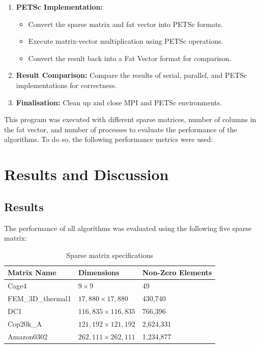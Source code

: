 \documentclass[12pt,oneside]{book} %
\begin{document}
\begin{enumerate}
    \item \textbf{PETSc Implementation:}
          \begin{itemize}
              \item Convert the sparse matrix and fat vector into PETSc formats.
              \item Execute matrix-vector multiplication using PETSc operations.
              \item Convert the result back into a Fat Vector format for comparison.
          \end{itemize}
    \item \textbf{Result Comparison:} Compare the results of serial, parallel, and PETSc implementations for correctness.
    \item \textbf{Finalisation:} Clean up and close MPI and PETSc environments.
\end{enumerate}

This program was executed with different sparse matrices, number of columns in
the fat vector, and number of processes to evaluate the performance of the
algorithms. To do so, the following performance metrics were used:

\newpage

\chapter{Results and Discussion}
\section{Results}

The performance of all algorithms was evaluated using the following five sparse
matrix:
\begin{table}[h]
    \centering
    \begin{tabular}{|l|l|l|}
        \hline
        \textbf{Matrix Name} & \textbf{Dimensions}        & \textbf{Non-Zero Elements} \\ \hline
        Cage4                & \(9 \times 9\)             & 49                         \\ \hline
        FEM\_3D\_thermal1    & \(17,880 \times 17,880\)   & 430,740                    \\ \hline
        DC1                  & \(116,835 \times 116,835\) & 766,396                    \\ \hline
        Cop20k\_A            & \(121,192 \times 121,192\) & 2,624,331                  \\ \hline
        Amazon0302           & \(262,111 \times 262,111\) & 1,234,877                  \\ \hline
    \end{tabular}
    \caption{Sparse matrix specifications}
    \label{tab:matrix_summary}
\end{table}
\end{document}
